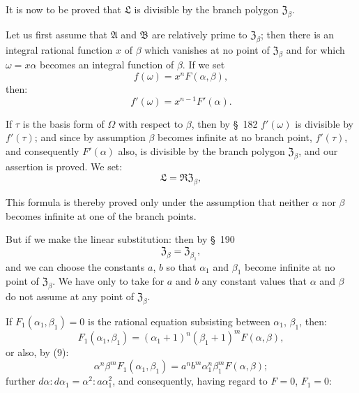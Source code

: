 It is now to be proved that $\mathfrak{L}$ is divisible by the branch polygon $\mathfrak{Z}_\beta$.

Let us first assume that $\mathfrak{A}$ and $\mathfrak{B}$ are relatively prime to $\mathfrak{Z}_\beta$; then there is an integral rational function $x$ of $\beta$ which vanishes at no point of $\mathfrak{Z}_\beta$ and for which $\omega = x\alpha$ becomes an integral function of $\beta$. If we set
\[
f(\omega) = x^n F(\alpha,\beta),
\]
then:
\[
f'(\omega) = x^{n-1}F'(\alpha).
\]

If $\tau$ is the basis form of $\Omega$ with respect to $\beta$, then by \S\ 182 $f'(\omega)$ is divisible by $f'(\tau)$; and since by assumption $\beta$ becomes infinite at no branch point, $f'(\tau)$, and consequently $F'(\alpha)$ also, is divisible by the branch polygon $\mathfrak{Z}_\beta$, and our assertion is proved. We set:
\[
\mathfrak{L} = \mathfrak{R}\mathfrak{Z}_\beta,
\]

This formula is thereby proved only under the assumption that neither $\alpha$ nor $\beta$ becomes infinite at one of the branch points.

But if we make the linear substitution:
then by \S\ 190
\[
\mathfrak{Z}_\beta = \mathfrak{Z}_{\beta_1},
\]
and we can choose the constants $a$, $b$ so that $\alpha_1$ and $\beta_1$ become infinite at no point of $\mathfrak{Z}_\beta$. We have only to take for $a$ and $b$ any constant values that $\alpha$ and $\beta$ do not assume at any point of $\mathfrak{Z}_\beta$.

If $F_1(\alpha_1,\beta_1)=0$ is the rational equation subsisting between $\alpha_1$, $\beta_1$, then:
\[
F_1(\alpha_1,\beta_1) = (\alpha_1+1)^n(\beta_1+1)^m F(\alpha,\beta),
\]
or also, by (9):
\[
\alpha^n\beta^m F_1(\alpha_1,\beta_1) = a^n b^m \alpha_1^n \beta_1^m F(\alpha,\beta);
\]
further $d\alpha : d\alpha_1 = \alpha^2 : a\alpha_1^2$, and consequently, having regard to $F=0$, $F_1=0$:

